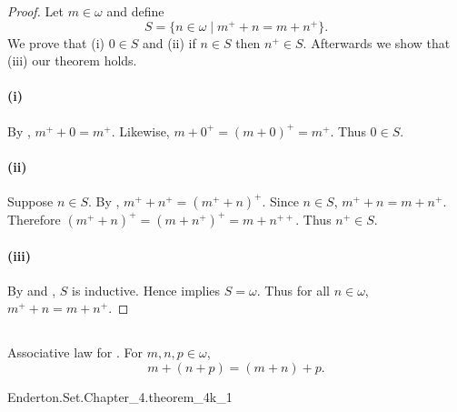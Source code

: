 \documentclass{report}
\begin{document}
  \begin{proof}

    Let $m \in \omega$ and define
      $$S = \{n \in \omega \mid m^+ + n = m + n^+\}.$$
    We prove that (i) $0 \in S$ and (ii) if $n \in S$ then $n^+ \in S$.
    Afterwards we show that (iii) our theorem holds.

    \paragraph{(i)}%

      By , $m^+ + 0 = m^+$.
      Likewise, $m + 0^+ = (m + 0)^+ = m^+$.
      Thus $0 \in S$.

    \paragraph{(ii)}%

      Suppose $n \in S$.
      By , $m^+ + n^+ = (m^+ + n)^+$.
      Since $n \in S$, $m^+ + n = m + n^+$.
      Therefore $(m^+ + n)^+ = (m + n^+)^+ = m + n^{++}$.
      Thus $n^+ \in S$.

    \paragraph{(iii)}%

      By  and , $S$ is inductive.
      Hence  implies $S = \omega$.
      Thus for all $n \in \omega$, $m^+ + n = m + n^+$.

  \end{proof}

\subsection{}%

  \begin{theorem}[4K-1]
    Associative law for .
    For $m, n, p \in \omega$, $$m + (n + p) = (m + n) + p.$$
  \end{theorem}

    {Enderton.Set.Chapter\_4.theorem\_4k\_1}

\end{document}

